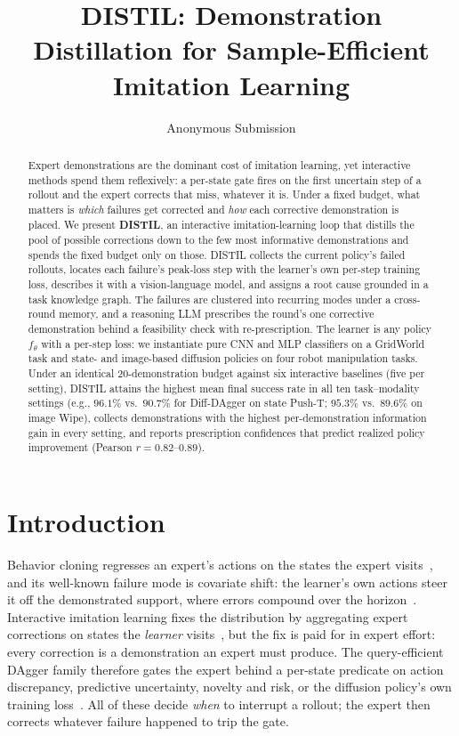 \documentclass[letterpaper]{article} %
\title{DISTIL: Demonstration Distillation for Sample-Efficient Imitation Learning}
\author{
    Anonymous Submission
}
\begin{document}
\maketitle

\begin{abstract}
Expert demonstrations are the dominant cost of imitation learning, yet
interactive methods spend them reflexively: a per-state gate fires on the first
uncertain step of a rollout and the expert corrects that miss, whatever it is.
Under a fixed budget, what matters is \emph{which} failures get corrected and
\emph{how} each corrective demonstration is placed.
We present \textbf{DISTIL}, an interactive imitation-learning loop that
distills the pool of possible corrections down to the few most informative
demonstrations and spends the fixed budget only on those.
DISTIL collects the current policy's failed rollouts, locates each failure's
peak-loss step with the learner's own per-step training loss, describes it
with a vision-language model, and assigns a root cause grounded in a task
knowledge graph. The failures are clustered into recurring modes under a
cross-round memory, and a reasoning LLM prescribes the round's one
corrective demonstration behind a feasibility check with re-prescription.
The learner is any policy
$f_\theta$ with a per-step loss: we instantiate pure CNN and MLP classifiers on
a GridWorld task and state- and image-based diffusion policies on four robot
manipulation tasks. Under an identical 20-demonstration budget against six
interactive baselines (five per setting), DISTIL attains the highest mean final success rate in
all ten task--modality settings (e.g., $96.1\%$ vs.\ $90.7\%$ for Diff-DAgger on
state Push-T; $95.3\%$ vs.\ $89.6\%$ on image Wipe), collects demonstrations
with the highest per-demonstration information gain in every setting, and
reports prescription confidences that predict realized policy
improvement (Pearson $r=0.82$--$0.89$).
\end{abstract}

\section{Introduction}

Behavior cloning regresses an expert's actions on the states the expert
visits~\citep{pomerleau1988alvinn}, and its well-known
failure mode is covariate shift: the learner's own actions steer it off the
demonstrated support, where errors compound over the
horizon~\citep{ross2011dagger}. Interactive imitation learning fixes the
distribution by aggregating expert corrections on states the \emph{learner}
visits~\citep{ross2011dagger,celemin2022iil}, but the fix is paid for in
expert effort: every correction is a demonstration an expert must produce.
The query-efficient DAgger family therefore gates the expert behind a
per-state predicate on action discrepancy, predictive uncertainty, novelty
and risk, or the diffusion policy's own training
loss~\citep{zhang2017safedagger,menda2017dropoutdagger,menda2019ensembledagger,hoque2021thriftydagger,lee2025diffdagger}.
All of these decide \emph{when} to interrupt a rollout; the expert then
corrects whatever failure happened to trip the gate.
\end{document}

